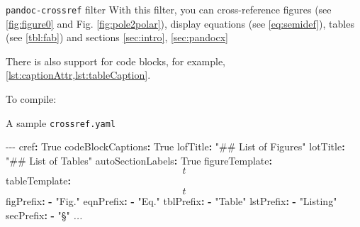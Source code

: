 \documentclass[
  10pt,
  ignorenonframetext,
  serif,onlymath]{beamer}
\newenvironment{Shaded}{}{}
\newcommand{\AttributeTok}[1]{\textcolor[rgb]{0.49,0.56,0.16}{#1}}
\newcommand{\CharTok}[1]{\textcolor[rgb]{0.25,0.44,0.63}{#1}}
\newcommand{\CommentTok}[1]{\textcolor[rgb]{0.38,0.63,0.69}{\textit{#1}}}
\newcommand{\DataTypeTok}[1]{\textcolor[rgb]{0.56,0.13,0.00}{#1}}
\newcommand{\ExtensionTok}[1]{#1}
\newcommand{\FunctionTok}[1]{\textcolor[rgb]{0.02,0.16,0.49}{#1}}
\newcommand{\KeywordTok}[1]{\textcolor[rgb]{0.00,0.44,0.13}{\textbf{#1}}}
\newcommand{\NormalTok}[1]{#1}
\newcommand{\PreprocessorTok}[1]{\textcolor[rgb]{0.74,0.48,0.00}{#1}}
\newcommand{\StringTok}[1]{\textcolor[rgb]{0.25,0.44,0.63}{#1}}
\begin{document}
\begin{frame}[fragile]{\texttt{pandoc-crossref} filter}
\protect\hypertarget{sec:pandoc-crossref-filter-1}{}
With this filter, you can cross-reference figures (see
\cref{fig:figure0} and Fig. \ref{fig:pole2polar}), display equations
(see \cref{eq:semidef}), tables (see \cref{tbl:fab}) and sections
\cref{sec:intro}, \cref{sec:pandocx}

There is also support for code blocks, for example,
\cref{lst:captionAttr,lst:tableCaption}.

To compile:

\begin{Shaded}
\end{Shaded}
\end{frame}

\begin{frame}[fragile]{A sample \texttt{crossref.yaml}}
\protect\hypertarget{sec:a-sample-crossref.yaml}{}
\scriptsize

\begin{Shaded}
\begin{Highlighting}[]
\PreprocessorTok{{-}{-}{-}}
\FunctionTok{cref}\KeywordTok{:}\AttributeTok{ }\CharTok{True}
\FunctionTok{codeBlockCaptions}\KeywordTok{:}\AttributeTok{ }\CharTok{True}
\FunctionTok{lofTitle}\KeywordTok{:}\AttributeTok{ }\StringTok{"\#\# List of Figures"}
\FunctionTok{lotTitle}\KeywordTok{:}\AttributeTok{ }\StringTok{"\#\# List of Tables"}
\FunctionTok{autoSectionLabels}\KeywordTok{:}\AttributeTok{ }\CharTok{True}
\FunctionTok{figureTemplate}\KeywordTok{:}\AttributeTok{ $$t$$}
\FunctionTok{tableTemplate}\KeywordTok{:}\AttributeTok{ $$t$$}
\FunctionTok{figPrefix}\KeywordTok{:}
\AttributeTok{  }\KeywordTok{{-}}\AttributeTok{ }\StringTok{"Fig."}
\FunctionTok{eqnPrefix}\KeywordTok{:}
\AttributeTok{  }\KeywordTok{{-}}\AttributeTok{ }\StringTok{"Eq."}
\FunctionTok{tblPrefix}\KeywordTok{:}
\AttributeTok{  }\KeywordTok{{-}}\AttributeTok{ }\StringTok{"Table"}
\FunctionTok{lstPrefix}\KeywordTok{:}
\AttributeTok{  }\KeywordTok{{-}}\AttributeTok{ }\StringTok{"Listing"}
\FunctionTok{secPrefix}\KeywordTok{:}
\AttributeTok{  }\KeywordTok{{-}}\AttributeTok{ }\StringTok{"§"}
\CommentTok{...}
\end{Highlighting}
\end{Shaded}
\end{frame}
\end{document}
